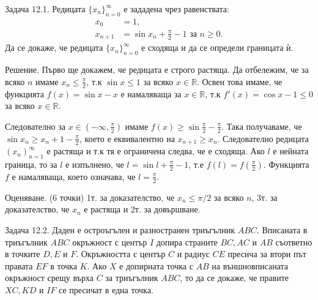 
Задача 12.1. Редицата $\{x_n\}_{n=0}^{\infty}$ е зададена чрез равенствата:
$$
\begin{aligned}
x_0&=1,\\
x_{n+1}&=\sin x_n+\frac{\pi}{2}-1\text{ за }n\geq0.
\end{aligned}
$$
Да се докаже, че редицата $\{x_n\}_{n=0}^{\infty}$ е сходяща и да се определи границата ѝ.

Решение. Първо ще докажем, че редицата е строго растяща. Да отбележим, че за всяко $n$ имаме $x_n\leq\frac{\pi}{2}$, т.к $\sin x\leq1$ за всяко $x\in\mathbb R$. Освен това имаме, че функцията $f(x)=\sin x-x$ е намаляваща за $x\in\mathbb R$, т.к $f'(x)=\cos x-1\leq0$ за всяко $x\in\mathbb R$.

Следователно за $x\in\left(-\infty,\frac{\pi}{2}\right)$ имаме $f(x)\geq\sin\frac{\pi}{2}-\frac{\pi}{2}$. Така получаваме, че $\sin x_n\geq x_n+1-\frac{\pi}{2}$, което е еквивалентно на $x_{n+1}\geq x_n$. Следователно редицата $(x_n)_{n=1}^{\infty}$ е растяща и т.к тя е ограничена следва, че е сходяща. Ако $l$ е нейната граница, то за $l$ е изпълнено, че $l=\sin l+\frac{\pi}{2}-1$, т.е $f(l)=f\left(\frac{\pi}{2}\right)$. Функцията $f$ е намаляваща, което означава, че $l=\frac{\pi}{2}$.

Оценяване. (6 точки) 1т. за доказателство, че $x_n\leq\pi/2$ за всяко $n$, 3т. за доказателство, че $x_n$ е растяща и 2т. за довършване.

Задача 12.2. Даден е остроъгълен и разностранен триъгълник $ABC$. Вписаната в триъгълник $ABC$ окръжност с център $I$ допира страните $BC,AC$ и $AB$ съответно в точките $D,E$ и $F$. Окръжността с център $C$ и радиус $CE$ пресича за втори път правата $EF$ в точка $K$. Ако $X$ е допирната точка с $AB$ на външновписаната окръжност срещу върха $C$ за триъгълник $ABC$, то да се докаже, че правите $XC,KD$ и $IF$ се пресичат в една точка.

